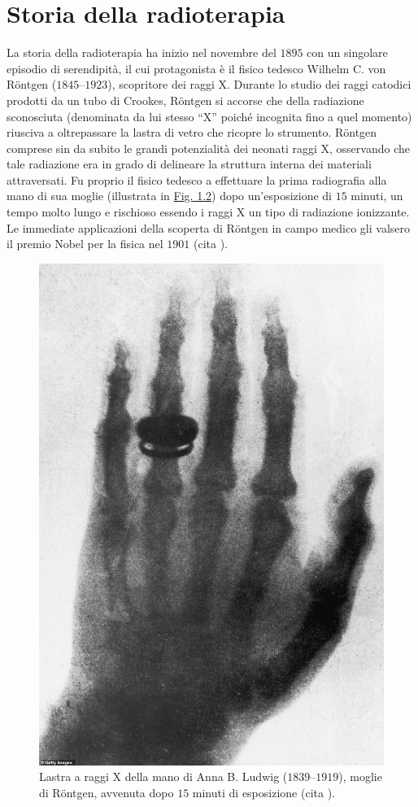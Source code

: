 \documentclass[12pt,a4paper,twoside]{report}
\begin{document}
	\section{Storia della radioterapia}
	La storia della radioterapia ha inizio nel novembre del $1895$ con un singolare episodio di serendipità, il cui protagonista è il fisico tedesco Wilhelm C. von Röntgen ($1845$--$1923$), scopritore dei raggi X. Durante lo studio dei raggi catodici prodotti da un tubo di Crookes, Röntgen si accorse che della radiazione sconosciuta (denominata da lui stesso ``X'' poiché incognita fino a quel momento) riusciva a oltrepassare la lastra di vetro che ricopre lo strumento. Röntgen comprese sin da subito le grandi potenzialità dei neonati raggi X, osservando che tale radiazione era in grado di delineare la struttura interna dei materiali attraversati. Fu proprio il fisico tedesco a effettuare la prima radiografia alla mano di sua moglie (illustrata in \hyperref[fig:rongten]{Fig. 1.2}) dopo un'esposizione di $15$ minuti, un tempo molto lungo e rischioso essendo i raggi X un tipo di radiazione ionizzante. Le immediate applicazioni della scoperta di Röntgen in campo medico gli valsero il premio Nobel per la fisica nel $1901$ (cita
	).
	\begin{figure}[H]
		\centering
		\includegraphics[width=0.5\linewidth]{rongten.jpg}
		\caption{Lastra a raggi X della mano di Anna B. Ludwig ($1839$--$1919$), moglie di Röntgen, avvenuta dopo $15$ minuti di esposizione (cita
			).}
		\label{fig:rongten}
	\end{figure}
\end{document}
